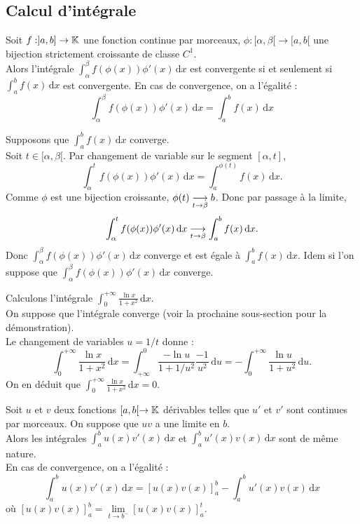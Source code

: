 \documentclass{book}
\begin{document}
\subsection{Calcul d'intégrale}
\begin{Theoreme}
Soit $f:]a,b]\to \mathbb{K} $ une fonction continue par morceaux, $\phi:[\alpha,\beta[\to  [a,b[$ une bijection strictement croissante de classe $C^1$.\\
Alors l'intégrale
$\int_\alpha^\beta f(\phi(x))\phi'(x)\,\mathrm dx $ est convergente si et seulement si $\int_a^b f(x)\,\mathrm dx$ est convergente. En cas de convergence, on a l'égalité :
$$\int_\alpha^\beta f(\phi(x))\phi'(x)\,\mathrm dx =\int_a^b f(x)\,\mathrm dx$$
\end{Theoreme}
\begin{Demonstration}
Supposons que $\int_a^b f(x)\,\mathrm dx$ converge.\\
Soit $t\in[\alpha,\beta[.$ Par changement de variable sur le
segment $[\alpha , t]$, 
$$\int_\alpha^t f(\phi(x))\phi'(x)\,\mathrm dx =\int_a^{\phi(t)} f(x)\,\mathrm dx.$$
Comme $\phi$ est une bijection croissante, $\phi(t )\tend[t \to \beta] b$. Donc par passage à la limite, 
$$\int_\alpha^t f(\phi(x))\phi'(x)\,\mathrm dx\tend[t \to \beta ] \int_a^b f(x)\,\mathrm dx.$$
Donc $\int_\alpha^\beta f(\phi(x))\phi'(x)\,\mathrm dx $ converge et est égale à  $\int_a^b f(x)\,\mathrm dx$.
Idem si l'on suppose que $\int_\alpha^\beta f(\phi(x))\phi'(x)\,\mathrm dx$ converge.
\end{Demonstration}
\begin{Exemple}
Calculons l'intégrale $\int_0^{+\infty}\frac{\ln x}{1+x^2}\,\mathrm dx$.\\
On suppose que l'intégrale converge (voir la prochaine sous-section pour la démonstration).\\
Le changement de variables $u=1/t$ donne :
$$\int^{+\infty }_0 \frac{\ln x}{1+x^2}\,\mathrm dx=\int^{0}_{+\infty } \frac{-\ln u}{1+1/u^2}\frac{-1}{u^2}\,\mathrm du=-\int^{+\infty }_0 \frac{\ln u}{1+u^2}\,\mathrm du.$$
On en déduit que $\int_0^{+\infty}\frac{\ln x}{1+x^2}\,\mathrm dx=0$.
\end{Exemple}
\begin{Theoreme}
Soit $u$ et $v$ deux fonctions $[a,b[ \to\mathbb{K} $ dérivables telles que $u'$ et $v'$ sont continues par morceaux. On suppose que $uv$ a une limite  en $b$.\\
Alors les intégrales $\int_a^b u(x)v'(x)\,\mathrm dx $ et $\int_a^b u'(x)v(x)\,\mathrm dx $ sont de même nature.\\
En cas de convergence, on a l'égalité :
\[ \int_a^b u(x)v'(x)\,\mathrm dx = \left[u(x)v(x)\right]_a^b - \int_a^b u'(x)v(x)\,\mathrm dx \]
où $\left[u(x)v(x)\right]_a^b = \lim\limits_{t \to b^-} \left[ u(x)v(x)\right]_a^t$.\\
\end{Theoreme}
\end{document}
